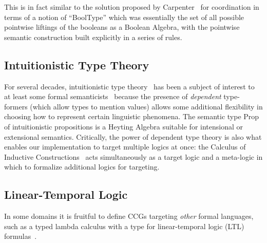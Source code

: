 \documentclass[11pt,a4paper,acceptedWithA]{article}
\begin{document}
This is in fact similar to the solution proposed by Carpenter~\cite[Ch.~6]{carpenter1998type} for coordination in terms of a notion of ``\textsf{BoolType}'' which was essentially the set of all possible pointwise liftings of the booleans as a Boolean Algebra, with the pointwise semantic construction built explicitly in a series of rules.

\subsection{Intuitionistic Type Theory}
For several decades, intuitionistic type theory~ has been a subject of interest to at least some formal semanticists~\cite{ranta1991intuitionistic,ranta1994ttg,luo2010type,chatz2014nlcoq,chatzikyriakidis2017modern,bekki14dts,sundholm1986proof} because the presence of \emph{dependent} type-formers (which allow types to mention values) allows some additional flexibility in choosing how to represent certain linguistic phenomena.
The semantic type \textsf{Prop} of intuitionistic propositions is a Heyting Algebra suitable for intensional or extensional semantics.
Critically, the power of dependent type theory is also what enables our implementation to target multiple logics at once: the Calculus of Inductive Constructions~ acts simultaneously as a target logic and a meta-logic in which to formalize additional logics for targeting.


\subsection{Linear-Temporal Logic}
In some domains it is fruitful to define CCGs targeting \emph{other} formal languages, such as a typed lambda calculus with a type for linear-temporal logic (\textsc{LTL}) formulas~.
\end{document}
